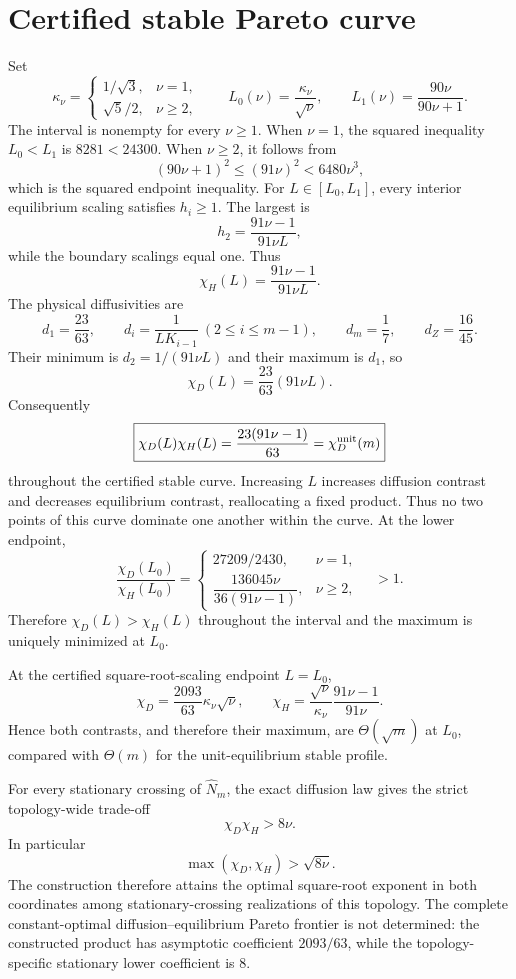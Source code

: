\section*{Certified stable Pareto curve}
Set
\[
 \kappa_\nu=\begin{cases}
 1/\sqrt3,&\nu=1,\\
 \sqrt5/2,&\nu\ge2,
 \end{cases}
 \qquad
 L_0(\nu)=\frac{\kappa_\nu}{\sqrt\nu},
 \qquad L_1(\nu)=\frac{90\nu}{90\nu+1}.
\]
The interval is nonempty for every $\nu\ge1$.  When $\nu=1$, the squared
inequality $L_0<L_1$ is $8281<24300$.  When $\nu\ge2$, it follows from
\[
 (90\nu+1)^2\le(91\nu)^2<6480\nu^3,
\]
which is the squared endpoint inequality.  For
$L\in[L_0,L_1]$, every interior equilibrium scaling satisfies $h_i\ge1$.
The largest is
\[
 h_2=\frac{91\nu-1}{91\nu L},
\]
while the boundary scalings equal one.  Thus
\[
 \chi_H(L)=\frac{91\nu-1}{91\nu L}.
\]
The physical diffusivities are
\[
 d_1=\frac{23}{63},
 \qquad d_i=\frac1{LK_{i-1}}
 \ (2\le i\le m-1),
 \qquad d_m=\frac17,
 \qquad d_Z=\frac{16}{45}.
\]
Their minimum is $d_2=1/(91\nu L)$ and their maximum is $d_1$, so
\[
 \chi_D(L)=\frac{23}{63}(91\nu L).
\]
Consequently
\[
 \boxed{\chi_D(L)\chi_H(L)=\frac{23(91\nu-1)}{63}
 =\chi_D^{\rm unit}(m)}
\]
throughout the certified stable curve.  Increasing $L$ increases diffusion
contrast and decreases equilibrium contrast, reallocating a fixed product.
Thus no two points of this curve dominate one another within the curve.
At the lower endpoint,
\[
 \frac{\chi_D(L_0)}{\chi_H(L_0)}=
 \begin{cases}
  27209/2430,&\nu=1,\\[2pt]
  \dfrac{136045\nu}{36(91\nu-1)},&\nu\ge2,
 \end{cases}
 \quad >1.
\]
Therefore $\chi_D(L)>\chi_H(L)$ throughout the interval and the maximum is
uniquely minimized at $L_0$.

At the certified square-root-scaling endpoint $L=L_0$,
\[
 \chi_D=\frac{2093}{63}\kappa_\nu\sqrt{\nu},
 \qquad
 \chi_H=\frac{\sqrt\nu}{\kappa_\nu}\frac{91\nu-1}{91\nu}.
\]
Hence both contrasts, and therefore their maximum, are $\Theta(\sqrt m)$ at
$L_0$, compared with $\Theta(m)$ for the unit-equilibrium stable profile.

For every stationary crossing of $\widehat N_m$, the exact diffusion law gives
the strict topology-wide trade-off
\[
 \chi_D\chi_H>8\nu.
\]
In particular
\[
 \max(\chi_D,\chi_H)>\sqrt{8\nu}.
\]
The construction therefore attains the optimal square-root exponent in both
coordinates among stationary-crossing realizations of this topology.  The
complete constant-optimal diffusion--equilibrium Pareto frontier is not
determined: the constructed product has asymptotic coefficient $2093/63$,
while the topology-specific stationary lower coefficient is $8$.
